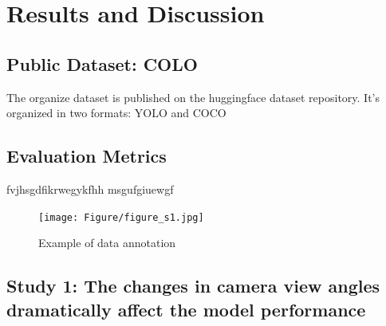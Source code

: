 \section{Results and Discussion}

\subsection*{Public Dataset: COLO}

The organize dataset is published on the huggingface dataset repository. It's organized in two formats: YOLO and COCO

\subsection*{Evaluation Metrics}

fvjhsgdfikrwegykfhh msgufgiuewgf
\begin{figure}[h]
    \centering
    \texttt{[image: Figure/figure\_s1.jpg]}
    \caption{Example of data annotation }
    \label{fig:metrics}
\end{figure}



\subsection*{Study 1: The changes in camera view angles dramatically affect the model performance}


